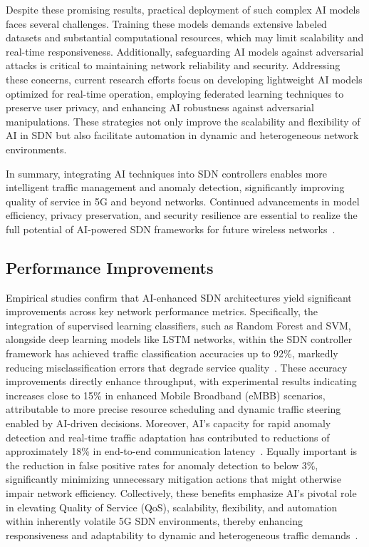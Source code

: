\documentclass[sigconf]{acmart}
\begin{document}
Despite these promising results, practical deployment of such complex AI models faces several challenges. Training these models demands extensive labeled datasets and substantial computational resources, which may limit scalability and real-time responsiveness. Additionally, safeguarding AI models against adversarial attacks is critical to maintaining network reliability and security. Addressing these concerns, current research efforts focus on developing lightweight AI models optimized for real-time operation, employing federated learning techniques to preserve user privacy, and enhancing AI robustness against adversarial manipulations. These strategies not only improve the scalability and flexibility of AI in SDN but also facilitate automation in dynamic and heterogeneous network environments.

In summary, integrating AI techniques into SDN controllers enables more intelligent traffic management and anomaly detection, significantly improving quality of service in 5G and beyond networks. Continued advancements in model efficiency, privacy preservation, and security resilience are essential to realize the full potential of AI-powered SDN frameworks for future wireless networks~\cite{ref52}.

\subsection{Performance Improvements}

Empirical studies confirm that AI-enhanced SDN architectures yield significant improvements across key network performance metrics. Specifically, the integration of supervised learning classifiers, such as Random Forest and SVM, alongside deep learning models like LSTM networks, within the SDN controller framework has achieved traffic classification accuracies up to 92\%, markedly reducing misclassification errors that degrade service quality~\cite{ref52}. These accuracy improvements directly enhance throughput, with experimental results indicating increases close to 15\% in enhanced Mobile Broadband (eMBB) scenarios, attributable to more precise resource scheduling and dynamic traffic steering enabled by AI-driven decisions. Moreover, AI’s capacity for rapid anomaly detection and real-time traffic adaptation has contributed to reductions of approximately 18\% in end-to-end communication latency~\cite{ref52}. Equally important is the reduction in false positive rates for anomaly detection to below 3\%, significantly minimizing unnecessary mitigation actions that might otherwise impair network efficiency. Collectively, these benefits emphasize AI’s pivotal role in elevating Quality of Service (QoS), scalability, flexibility, and automation within inherently volatile 5G SDN environments, thereby enhancing responsiveness and adaptability to dynamic and heterogeneous traffic demands~\cite{ref52}.
\end{document}
